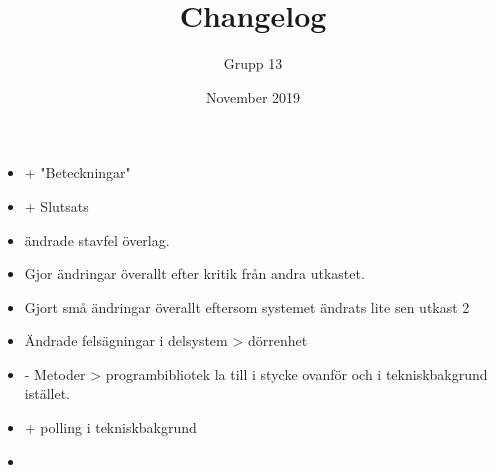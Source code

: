 \documentclass{article}
\title{Changelog}
\author{Grupp 13}
\date{November 2019}
\begin{document}
\maketitle
\begin{itemize}
    \item + "Beteckningar"
    \item + Slutsats
    \item ändrade stavfel överlag.
    \item Gjor ändringar överallt efter kritik från andra utkastet. 
    \item Gjort små ändringar överallt eftersom systemet ändrats lite sen utkast 2
    \item Ändrade felsägningar i delsystem > dörrenhet
    \item - Metoder > programbibliotek la till i stycke ovanför och i tekniskbakgrund istället.
    \item + polling i tekniskbakgrund
    \item 
\end{itemize}
\end{document}
